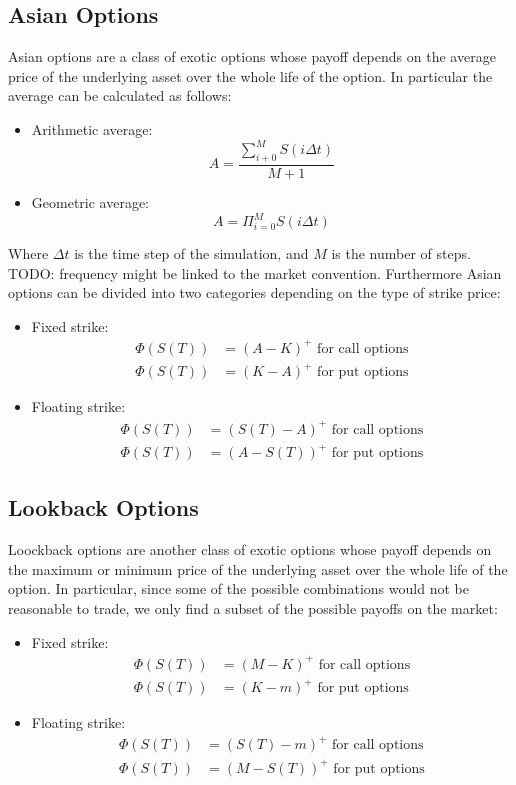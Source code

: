 \subsection*{Asian Options}
Asian options are a class of exotic options whose payoff depends on the average
price of the underlying asset over the whole life of the option. In particular
the average can be calculated as follows:

\begin{itemize}
    \item Arithmetic average: \[ A = \frac{\sum^M_{i+0} S(i\Delta t)}{M+1} \]
    \item Geometric average: \[ A = \Pi_{i=0}^M S(i\Delta t) \]
\end{itemize}

Where $\Delta t$ is the time step of the simulation, and $M$ is the number of
steps. TODO: frequency might be linked to the market convention.
Furthermore Asian options can be divided into two categories depending on the
type of strike price:

\begin{itemize}
    \item Fixed strike: \begin{align*}
        \Phi(S(T)) & = (A - K)^+ \text{ for call options} \\
        \Phi(S(T)) & = (K - A)^+ \text{ for put options}
    \end{align*}
    \item Floating strike: \begin{align*}
    \Phi(S(T)) & = (S(T)-A)^+ \text{ for call options} \\
    \Phi(S(T)) & = (A-S(T))^+ \text{ for put options}
\end{align*}
\end{itemize}

\subsection*{Lookback Options}
Loockback options are another class of exotic options whose payoff depends on
the maximum or minimum price of the underlying asset over the whole life of
the option. In particular, since some of the possible combinations would not be
reasonable to trade, we only find a subset of the possible payoffs on the
market:

\begin{itemize}
    \item Fixed strike: \begin{align*}
        \Phi(S(T)) & = (M - K)^+ \text{ for call options} \\
        \Phi(S(T)) & = (K - m)^+ \text{ for put options}
    \end{align*}
    \item Floating strike: \begin{align*}
        \Phi(S(T)) & = (S(T)-m)^+ \text{ for call options} \\
        \Phi(S(T)) & = (M-S(T))^+ \text{ for put options}
    \end{align*}
\end{itemize}

